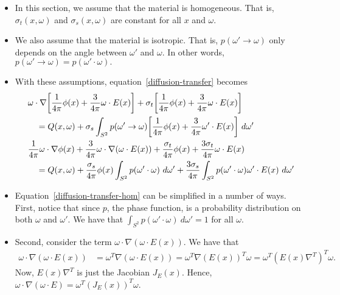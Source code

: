 \documentclass[10pt]{article}
\begin{document}
		\begin{itemize}
			\item In this section, we assume that the material is homogeneous. That is, $\sigma_t(x,\omega)$ and $\sigma_s(x,\omega)$ are constant
				for all $x$ and $\omega$. 
				
			\item We also assume that the material is isotropic. That is, $p(\omega' \rightarrow \omega)$ only depends on the 
				angle between $\omega'$ and $\omega.$ In other words, $p(\omega' \rightarrow \omega) = p(\omega' \cdot \omega).$
				
			\item With these assumptions, equation~\ref{diffusion-transfer} becomes
				\begin{align} \label{diffusion-transfer-hom}
					&\omega \cdot \nabla \bigg[ \frac{1}{4\pi} \phi(x) + \frac{3}{4\pi} \omega \cdot E(x) \bigg] +
					\sigma_t \bigg[ \frac{1}{4\pi} \phi(x) + \frac{3}{4\pi} \omega \cdot E(x) \bigg] \notag \\
					& \quad =  Q(x,\omega)
					+ \sigma_s \int_{S^2} p(\omega' \rightarrow \omega) \bigg[ \frac{1}{4\pi} \phi(x) + \frac{3}{4\pi} \omega' \cdot E(x) \bigg]\ d \omega' \notag \\
					&\frac{1}{4\pi} \omega \cdot \nabla \phi(x) + \frac{3}{4\pi} \omega \cdot \nabla (\omega \cdot E(x)) +
					 \frac{\sigma_t}{4\pi} \phi(x) + \frac{3\sigma_t}{4\pi} \omega \cdot E(x) \notag \\
					& \quad =  Q(x,\omega)
					+ \frac{\sigma_s }{4\pi} \phi(x) \int_{S^2} p(\omega' \cdot \omega)\ d\omega'   + \frac{3 \sigma_s}{4\pi} \int_{S^2} p(\omega' \cdot \omega) \omega' \cdot E(x) \ d \omega'
				\end{align}
			
			\item Equation~\ref{diffusion-transfer-hom} can be simplified in a number of ways. First, notice that since $p$, the
			  phase function, is a probability distribution on both $\omega$ and $\omega'$. We have that
			  $\int_{S^2} p(\omega' \cdot \omega)\ d\omega' = 1$ for all $\omega$. 				
			
			\item Second, consider the term $\omega \cdot \nabla (\omega \cdot E(x))$. We have that
				\begin{align*}
					\omega \cdot \nabla(\omega \cdot E(x))
					&= \omega^T \nabla(\omega \cdot E(x))
					= \omega^T \nabla (E(x))^T \omega
					= \omega^T (E(x) \nabla^T)^T \omega.
				\end{align*}
				Now, $E(x) \nabla^T$ is just the Jacobian $J_E(x)$. Hence, $\omega \cdot \nabla(\omega \cdot E) = \omega^T (J_E(x))^T \omega$.
				

\end{itemize}
\end{document}
